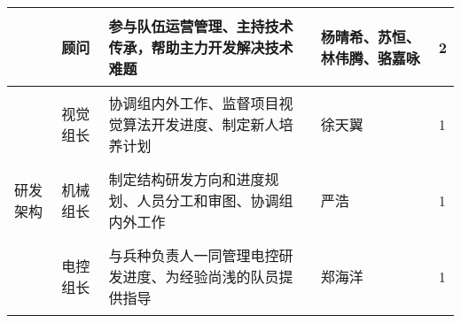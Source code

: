 \begin{longtable}{X | X | X | X | X}
    \cline{2-5}

        &
        \begin{center}
            顾问
        \end{center} &
        参与队伍运营管理、主持技术传承，帮助主力开发解决技术难题 &
        \begin{center}
            杨晴希、苏恒、林伟腾、骆嘉咏
        \end{center} &
        \begin{center}
            2
        \end{center}\\

    \hline

        \multirow{16}{*}{研发架构} &
        \begin{center}
            视觉组长
        \end{center}&
        协调组内外工作、监督项目视觉算法开发进度、制定新人培养计划 &
        \begin{center}
            徐天翼
        \end{center} &
        \begin{center}
            1
        \end{center}\\

    \cline{2-5}

        &
        \begin{center}
            机械组长
        \end{center}&
        制定结构研发方向和进度规划、人员分工和审图、协调组内外工作 &
        \begin{center}
            严浩
        \end{center} &
        \begin{center}
            1
        \end{center}\\

    \cline{2-5}

        &
        \begin{center}
            电控组长
        \end{center}&
        与兵种负责人一同管理电控研发进度、为经验尚浅的队员提供指导 &
        \begin{center}
            郑海洋
        \end{center} &
        \begin{center}
            1
        \end{center}\\


\end{longtable}
